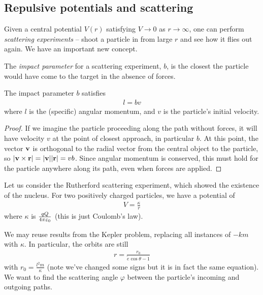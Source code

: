 \documentclass{../template/note}
\begin{document}
    \subsection{Repulsive potentials and scattering}

    Given a central potential \(V(r)\) satisfying \(V \to 0\) as \(r \to \infty\), one can perform \emph{scattering experiments} -- shoot a particle in from large \(r\) and see how it flies out again. We have an important new concept.

    \begin{definition}
        The \emph{impact parameter} for a scattering experiment, \(b\), is the closest the particle would have come to the target in the absence of forces.
    \end{definition}

    \begin{proposition}
        The impact parameter \(b\) satisfies
        \begin{align*}
            l = bv
        \end{align*}
        where \(l\) is the (specific) angular momentum, and \(v\) is the particle's initial velocity.        
    \end{proposition}
    
    \begin{proof}
        If we imagine the particle proceeding along the path without forces, it will have velocity \(v\) at the point of closest approach, in particular \(b\). At this point, the vector \(\V v\) is orthogonal to the radial vector from the central object to the particle, so \(|\V v \times \V r| = |\V v||\V r| = vb\). Since angular momentum is conserved, this must hold for the particle anywhere along its path, even when forces are applied.
    \end{proof}
    
    Let us consider the Rutherford scattering experiment, which showed the existence of the nucleus. For two positively charged particles, we have a potential of
    \begin{align*}
        V = \frac{\kappa}{r}
    \end{align*}
    where \(\kappa\) is \(\frac{qQ}{4\pi\varepsilon_0}\) (this is just Coulomb's law).

    We may reuse results from the Kepler problem, replacing all instances of \(-km\) with \(\kappa\). In particular, the orbits are still
    \begin{align*}
        r = \frac{r_0}{\tilde e \cos \theta - 1}
    \end{align*}
    with \(r_0 = \frac{l^2m}{\kappa}\) (note we've changed some signs but it is in fact the same equation). We want to find the scattering angle \(\varphi\) between the particle's incoming and outgoing paths.
\end{document}
